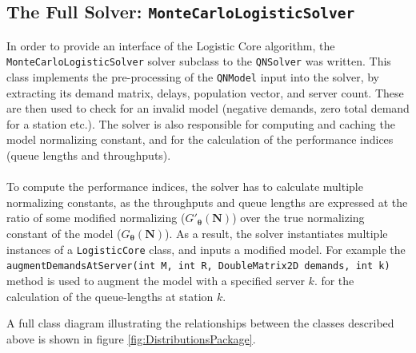 \subsection*{The Full Solver: \texttt{MonteCarloLogisticSolver}}
In order to provide an interface of the Logistic Core algorithm, the \texttt{MonteCarloLogisticSolver} solver subclass to the \texttt{QNSolver} was written. This class implements the pre-processing of the \texttt{QNModel} input into the solver, by extracting its demand matrix, delays, population vector, and server count. These are then used to check for an invalid model (negative demands, zero total demand for a station etc.). The solver is also responsible for computing and caching the model normalizing constant, and for the calculation of the performance indices (queue lengths and throughputs).
\\\\
To compute the performance indices, the solver has to calculate multiple normalizing constants, as the throughputs and queue lengths are expressed at the ratio of some modified normalizing (\(G'_{\boldsymbol{\theta}}(\mathbf{N})\)) over the true normalizing constant of the model (\(G_{\boldsymbol{\theta}}(\mathbf{N})\)). As a result, the solver instantiates multiple instances of a \texttt{LogisticCore} class, and inputs a modified model. For example the \texttt{augmentDemandsAtServer(int M, int R, DoubleMatrix2D demands, int k)} method is used to augment the model with a specified server \(k\). for the calculation of the queue-lengths at station \(k\).



A full class diagram illustrating the relationships between the classes described above is shown in figure \ref{fig:DistributionsPackage}. 

